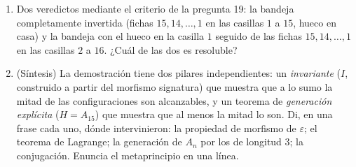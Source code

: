 \begin{problem}
\begin{enumerate}[resume]
         de $n \geq 4$ casillas con $n - 1$ fichas. Prueba
        que el   de las fichas es invariante, que cada
        clase de alcanzabilidad tiene exactamente $n(n - 1)$
        configuraciones \emph{(las clases son las órbitas de un
         de  $\operatorname{lcm}(n, n-1) =
        n(n-1)$)}, y que hay $(n - 2)!$ clases ---para $n \geq 5$,
        muchas más que $2$---: en un tablero estrecho el
        invariante de paridad casi no captura nada y manda la
        geometría.
  \item Dos veredictos mediante el criterio de la pregunta 19: la
        bandeja completamente invertida (fichas $15, 14, \dots, 1$
        en las casillas $1$ a $15$, hueco en casa) y la bandeja
        con el hueco en la casilla $1$ seguido de las fichas $15,
        14, \dots, 1$ en las casillas $2$ a $16$. ¿Cuál de las dos
        es resoluble?
  \item (Síntesis) La demostración tiene dos pilares
        independientes: un \emph{invariante} ($I$, construido a
        partir del morfismo signatura) que muestra que a lo sumo
        la mitad de las configuraciones son alcanzables, y un
        teorema de \emph{generación explícita} ($H = A_{15}$) que
        muestra que al menos la mitad lo son. Di, en una frase
        cada uno, dónde intervinieron: la propiedad de morfismo de
        $\varepsilon$; el teorema de Lagrange; la generación de
        $A_n$ por los  de longitud $3$; la conjugación.
        Enuncia el metaprincipio en una línea.
\end{enumerate}
\end{problem}
